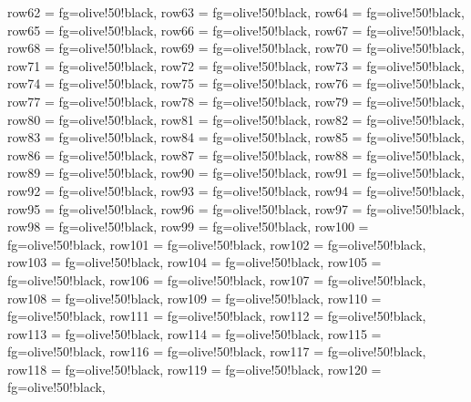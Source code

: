 \documentclass{article}
\begin{document}
\begin{tblr}
{             row{62} = {fg=olive!50!black},
             row{63} = {fg=olive!50!black},
             row{64} = {fg=olive!50!black},
             row{65} = {fg=olive!50!black},
             row{66} = {fg=olive!50!black},
             row{67} = {fg=olive!50!black},
             row{68} = {fg=olive!50!black},
             row{69} = {fg=olive!50!black},
             row{70} = {fg=olive!50!black},
             row{71} = {fg=olive!50!black},
             row{72} = {fg=olive!50!black},
             row{73} = {fg=olive!50!black},
             row{74} = {fg=olive!50!black},
             row{75} = {fg=olive!50!black},
             row{76} = {fg=olive!50!black},
             row{77} = {fg=olive!50!black},
             row{78} = {fg=olive!50!black},
             row{79} = {fg=olive!50!black},
             row{80} = {fg=olive!50!black},
             row{81} = {fg=olive!50!black},
             row{82} = {fg=olive!50!black},
             row{83} = {fg=olive!50!black},
             row{84} = {fg=olive!50!black},
             row{85} = {fg=olive!50!black},
             row{86} = {fg=olive!50!black},
             row{87} = {fg=olive!50!black},
             row{88} = {fg=olive!50!black},
             row{89} = {fg=olive!50!black},
             row{90} = {fg=olive!50!black},
             row{91} = {fg=olive!50!black},
             row{92} = {fg=olive!50!black},
             row{93} = {fg=olive!50!black},
             row{94} = {fg=olive!50!black},
             row{95} = {fg=olive!50!black},
             row{96} = {fg=olive!50!black},
             row{97} = {fg=olive!50!black},
             row{98} = {fg=olive!50!black},
             row{99} = {fg=olive!50!black},
             row{100} = {fg=olive!50!black},
             row{101} = {fg=olive!50!black},
             row{102} = {fg=olive!50!black},
             row{103} = {fg=olive!50!black},
             row{104} = {fg=olive!50!black},
             row{105} = {fg=olive!50!black},
             row{106} = {fg=olive!50!black},
             row{107} = {fg=olive!50!black},
             row{108} = {fg=olive!50!black},
             row{109} = {fg=olive!50!black},
             row{110} = {fg=olive!50!black},
             row{111} = {fg=olive!50!black},
             row{112} = {fg=olive!50!black},
             row{113} = {fg=olive!50!black},
             row{114} = {fg=olive!50!black},
             row{115} = {fg=olive!50!black},
             row{116} = {fg=olive!50!black},
             row{117} = {fg=olive!50!black},
             row{118} = {fg=olive!50!black},
             row{119} = {fg=olive!50!black},
             row{120} = {fg=olive!50!black},
}
\end{tblr}
\end{document}

